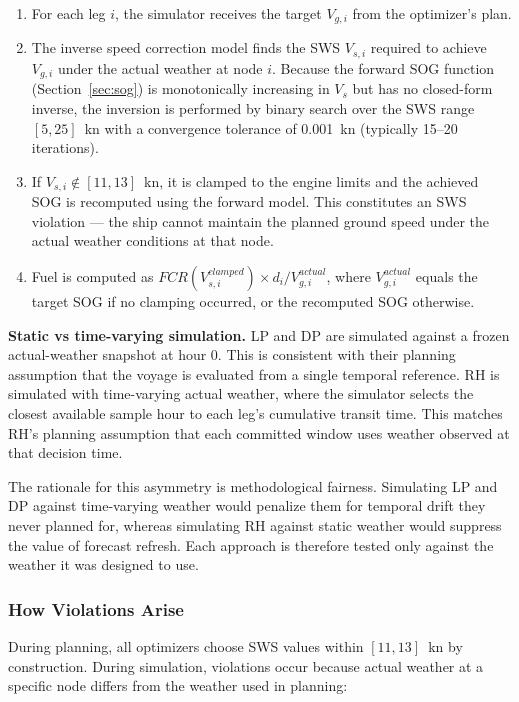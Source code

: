 \documentclass[review,authoryear]{elsarticle}  %
\begin{document}
\begin{enumerate}
    \item For each leg $i$, the simulator receives the target $V_{g,i}$ from the optimizer's plan.
    \item The inverse speed correction model finds the SWS $V_{s,i}$ required to achieve $V_{g,i}$ under the actual weather at node $i$. Because the forward SOG function (Section~\ref{sec:sog}) is monotonically increasing in $V_s$ but has no closed-form inverse, the inversion is performed by binary search over the SWS range $[5, 25]$~kn with a convergence tolerance of 0.001~kn (typically 15--20 iterations).
    \item If $V_{s,i} \notin [11, 13]$~kn, it is clamped to the engine limits and the achieved SOG is recomputed using the forward model. This constitutes an SWS violation --- the ship cannot maintain the planned ground speed under the actual weather conditions at that node.
    \item Fuel is computed as $FCR(V_{s,i}^{clamped}) \times d_i / V_{g,i}^{actual}$, where $V_{g,i}^{actual}$ equals the target SOG if no clamping occurred, or the recomputed SOG otherwise.
\end{enumerate}

\textbf{Static vs time-varying simulation.} LP and DP are simulated against a frozen actual-weather snapshot at hour 0. This is consistent with their planning assumption that the voyage is evaluated from a single temporal reference. RH is simulated with time-varying actual weather, where the simulator selects the closest available sample hour to each leg's cumulative transit time. This matches RH's planning assumption that each committed window uses weather observed at that decision time.


The rationale for this asymmetry is methodological fairness. Simulating LP and DP against time-varying weather would penalize them for temporal drift they never planned for, whereas simulating RH against static weather would suppress the value of forecast refresh. Each approach is therefore tested only against the weather it was designed to use.

\subsubsection{How Violations Arise}

During planning, all optimizers choose SWS values within $[11, 13]$~kn by construction. During simulation, violations occur because actual weather at a specific node differs from the weather used in planning:
\end{document}
